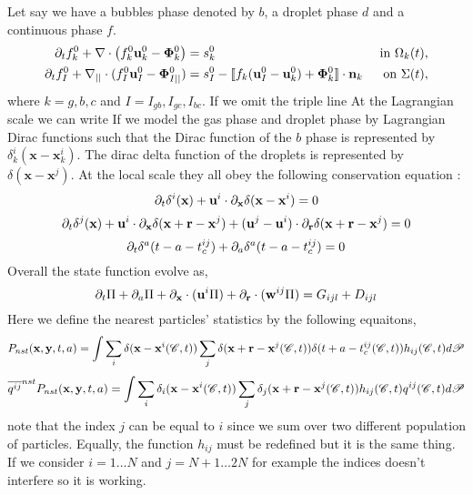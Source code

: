 Let say we have a bubbles phase denoted by $b$, a droplet phase $d$ and a continuous  phase $f$. 
\begin{align}
    \partial_t f_k^0
    +\mathbf{\nabla}\cdot \left(
        f_k^0\textbf{u}_k^0
        - \mathbf{\Phi}_k^0
        \right)
    &= 
    s_k^0
    & \text{ in } \Omega_k(t),&\\
    \partial_t f_I^0 
    +\mathbf{\nabla}_{||}\cdot
    (
        f_I^0 \textbf{u}_I^0
        - \mathbf{\Phi}_{I||}^0 
    )
    &= 
    s_I^0
    - \llbracket 
        f_k (\textbf{u}_I^0 - \textbf{u}_k^0)
        + \mathbf{\Phi}_k^0
      \rrbracket \cdot \textbf{n}_k 
    & \text{ on } \Sigma(t),&
\end{align}
where $k = g,b,c$ and $I = I_{gb},I_{gc},I_{bc}$.
If we omit the triple line At the Lagrangian scale we can write 
If we model the gas phase and droplet phase by Lagrangian Dirac functions such that the Dirac function of the $b$ phase is represented by $\delta_k^i(\textbf{x}- \textbf{x}^i_k)$. 
The dirac delta function of the droplets is represented by $\delta(\textbf{x} - \textbf{x}^j)$. 
At the local scale they all obey the following conservation equation : 
\begin{equation*}
    \partial_t \delta^i(\textbf{x})
    + \textbf{u}^i  \cdot \partial_{\textbf{x}} \delta(\textbf{x} - \textbf{x}^i)
    = 0 
\end{equation*}
\begin{equation*}
    \partial_t \delta^j(\textbf{x})
    + \textbf{u}^i \cdot \partial_{\textbf{x}}  \delta(\textbf{x} + \textbf{r} - \textbf{x}^j)
    + (\textbf{u}^j - \textbf{u}^i) \cdot \partial_{\textbf{r}}  \delta(\textbf{x} + \textbf{r} - \textbf{x}^j)
    = 0 
\end{equation*}
\begin{equation*}
    \partial_t \delta^a(t - a - t_c^{ij})
    + 
    \partial_a \delta^a(t - a - t_c^{ij})
    = 0 
\end{equation*}
Overall the state function evolve as, 
\begin{equation}
    \partial_t \Pi
    + \partial_a \Pi
    + \partial_{\textbf{x}} \cdot (\textbf{u}^i \Pi)
    + \partial_{\textbf{r}}  \cdot (\textbf{w}^{ij} \Pi)
    = G_{ijl}+D_{ijl}
\end{equation}
Here we define the nearest particles' statistics by the following equaitons,
\begin{equation}
    P_{nst}(\textbf{x},\textbf{y},t,a)= 
    \int \sum_{i}\delta(\textbf{x}-\textbf{x}^i(\mathscr{C},t))
    \sum_{j}\delta(\textbf{x}+\textbf{r}-\textbf{x}^j(\mathscr{C},t)) 
    \delta(t+a-t_c^{ij}(\mathscr{C},t)) 
    h_{ij}(\mathscr{C},t) d\mathscr{P} 
\end{equation}
\begin{equation}
    \overline{q^{ij}}^{nst}P_{nst}(\textbf{x},\textbf{y},t,a)= \int \sum_{i}\delta_i(\textbf{x}-\textbf{x}^i(\mathscr{C},t))
    \sum_{j}\delta_j(\textbf{x}+\textbf{r}-\textbf{x}^j(\mathscr{C},t)) h_{ij}(\mathscr{C},t) q^{ij}(\mathscr{C},t) d\mathscr{P} 
\end{equation}
note that the index $j$ can be equal to $i$ since we sum over two different population of particles. 
Equally, the function $h_{ij}$ must be redefined but it is the same thing. 
If we consider $i=1\ldots N$ and $j = N+1\ldots 2N$ for example the indices doesn't interfere so it is working. 